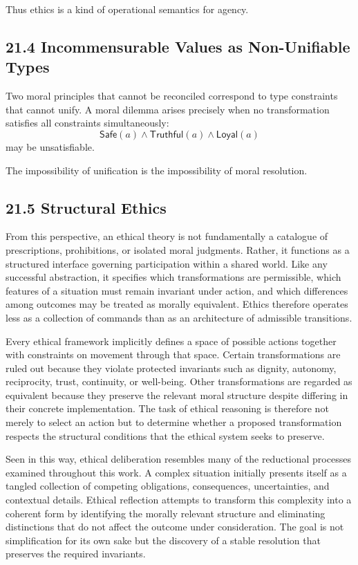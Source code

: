 \documentclass[12pt,letterpaper]{article}
\theoremstyle{remark}
\begin{document}
Thus ethics is a kind of operational semantics for agency.

\subsection{21.4 Incommensurable Values as Non-Unifiable Types}

Two moral principles that cannot be reconciled correspond to type constraints that cannot unify. A moral dilemma arises precisely when no transformation satisfies all constraints simultaneously:
\[
\mathsf{Safe}(a) \land \mathsf{Truthful}(a) \land \mathsf{Loyal}(a)
\]
may be unsatisfiable.

The impossibility of unification is the impossibility of moral resolution.

\subsection{21.5 Structural Ethics}

From this perspective, an ethical theory is not fundamentally a catalogue of prescriptions, prohibitions, or isolated moral judgments. Rather, it functions as a structured interface governing participation within a shared world. Like any successful abstraction, it specifies which transformations are permissible, which features of a situation must remain invariant under action, and which differences among outcomes may be treated as morally equivalent. Ethics therefore operates less as a collection of commands than as an architecture of admissible transitions.

Every ethical framework implicitly defines a space of possible actions together with constraints on movement through that space. Certain transformations are ruled out because they violate protected invariants such as dignity, autonomy, reciprocity, trust, continuity, or well-being. Other transformations are regarded as equivalent because they preserve the relevant moral structure despite differing in their concrete implementation. The task of ethical reasoning is therefore not merely to select an action but to determine whether a proposed transformation respects the structural conditions that the ethical system seeks to preserve.

Seen in this way, ethical deliberation resembles many of the reductional processes examined throughout this work. A complex situation initially presents itself as a tangled collection of competing obligations, consequences, uncertainties, and contextual details. Ethical reflection attempts to transform this complexity into a coherent form by identifying the morally relevant structure and eliminating distinctions that do not affect the outcome under consideration. The goal is not simplification for its own sake but the discovery of a stable resolution that preserves the required invariants.
\end{document}
